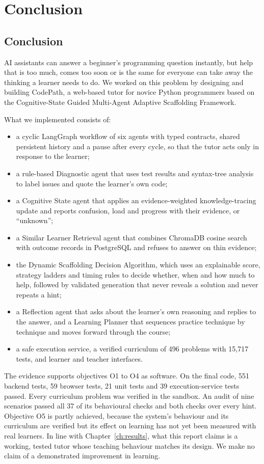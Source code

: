 \chapter{Conclusion}
\section{Conclusion}
AI assistants can answer a beginner's programming question instantly, but help that is too much, comes too soon or is the same for everyone can take away the thinking a learner needs to do. We worked on this problem by designing and building CodePath, a web-based tutor for novice Python programmers based on the Cognitive-State Guided Multi-Agent Adaptive Scaffolding Framework.

What we implemented consists of:
\begin{itemize}
\item a cyclic LangGraph workflow of six agents with typed contracts, shared persistent history and a pause after every cycle, so that the tutor acts only in response to the learner;
\item a rule-based Diagnostic agent that uses test results and syntax-tree analysis to label issues and quote the learner's own code;
\item a Cognitive State agent that applies an evidence-weighted knowledge-tracing update and reports confusion, load and progress with their evidence, or ``unknown'';
\item a Similar Learner Retrieval agent that combines ChromaDB cosine search with outcome records in PostgreSQL and refuses to answer on thin evidence;
\item the Dynamic Scaffolding Decision Algorithm, which uses an explainable score, strategy ladders and timing rules to decide whether, when and how much to help, followed by validated generation that never reveals a solution and never repeats a hint;
\item a Reflection agent that asks about the learner's own reasoning and replies to the answer, and a Learning Planner that sequences practice technique by technique and moves forward through the course;
\item a safe execution service, a verified curriculum of 496 problems with 15,717 tests, and learner and teacher interfaces.
\end{itemize}

The evidence supports objectives O1 to O4 as software. On the final code, 551 backend tests, 59 browser tests, 21 unit tests and 39 execution-service tests passed. Every curriculum problem was verified in the sandbox. An audit of nine scenarios passed all 37 of its behavioural checks and both checks over every hint. Objective O5 is partly achieved, because the system's behaviour and its curriculum are verified but its effect on learning has not yet been measured with real learners. In line with Chapter~\ref{ch:results}, what this report claims is a working, tested tutor whose teaching behaviour matches its design. We make no claim of a demonstrated improvement in learning.

